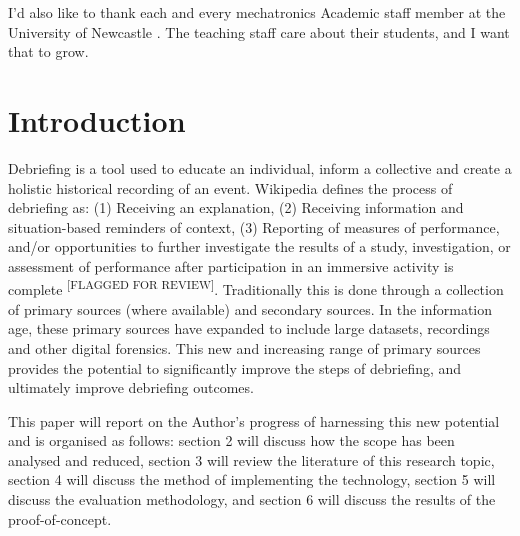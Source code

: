\documentclass{UoNMCHA}
\newcommand{\flagforreview}{\textsuperscript{\color{red} [FLAGGED FOR REVIEW]}}
\numberwithin{equation}{section}
\begin{document}
I'd also like to thank each and every mechatronics Academic staff member at the University of Newcastle . The teaching staff care about their students, and I want that to grow.
\newpage
\tableofcontents
\newpage
\section{Introduction}
Debriefing is a tool used to educate an individual, inform a collective and create a holistic historical recording of an event. Wikipedia defines the process of debriefing as: (1) Receiving an explanation, (2) Receiving information and situation-based reminders of context, (3) Reporting of measures of performance, and/or opportunities to further investigate the results of a study, investigation, or assessment of performance after participation in an immersive activity is complete \cite{Wiki}\flagforreview. Traditionally this is done through a collection of primary sources (where available) and secondary sources. In the information age, these primary sources have expanded to include large datasets, recordings and other digital forensics. This new and increasing range of primary sources provides the potential to significantly improve the steps of debriefing, and ultimately improve debriefing outcomes.

This paper will report on the Author’s progress of harnessing this new potential and is organised as follows: section 2 will discuss how the scope has been analysed and reduced, section 3 will review the literature of this research topic, section 4 will discuss the method of implementing the technology, section 5 will discuss the evaluation methodology, and section 6 will discuss the results of the proof-of-concept.

%
\end{document}
